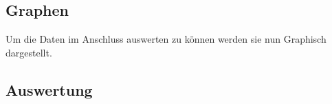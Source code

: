 \subsection{Graphen}
Um die Daten im Anschluss auswerten zu können werden sie nun Graphisch dargestellt.
\begin{center}
\noindent
\begin{minipage}{\linewidth}
\centering
{}
\end{minipage}

\begin{minipage}{\linewidth}
\centering
{}
\end{minipage}
\end{center}
\newpage
\subsection{Auswertung}
